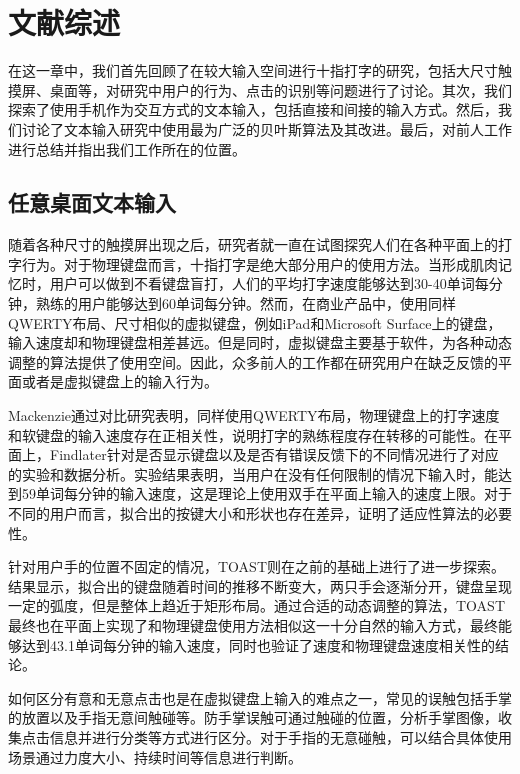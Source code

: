 \chapter{文献综述}
\label{cha:literature}
在这一章中，我们首先回顾了在较大输入空间进行十指打字的研究，包括大尺寸触摸屏、桌面等，对研究中用户的行为、点击的识别等问题进行了讨论。其次，我们探索了使用手机作为交互方式的文本输入，包括直接和间接的输入方式。然后，我们讨论了文本输入研究中使用最为广泛的贝叶斯算法及其改进。最后，对前人工作进行总结并指出我们工作所在的位置。

\section{任意桌面文本输入} %
随着各种尺寸的触摸屏出现之后，研究者就一直在试图探究人们在各种平面上的打字行为。对于物理键盘而言，十指打字是绝大部分用户的使用方法。当形成肌肉记忆时，用户可以做到不看键盘盲打，人们的平均打字速度能够达到30-40单词每分钟，熟练的用户能够达到60单词每分钟\cite{flatglass2011findlater}。然而，在商业产品中，使用同样QWERTY布局、尺寸相似的虚拟键盘，例如iPad和Microsoft Surface上的键盘，输入速度却和物理键盘相差甚远。但是同时，虚拟键盘主要基于软件，为各种动态调整的算法提供了使用空间。因此，众多前人的工作都在研究用户在缺乏反馈的平面或者是虚拟键盘上的输入行为。

Mackenzie通过对比研究表明\cite{mackenzie2001empirical}，同样使用QWERTY布局，物理键盘上的打字速度和软键盘的输入速度存在正相关性，说明打字的熟练程度存在转移的可能性。在平面上，Findlater针对是否显示键盘以及是否有错误反馈下的不同情况进行了对应的实验和数据分析\cite{flatglass2011findlater}。实验结果表明，当用户在没有任何限制的情况下输入时，能达到59单词每分钟的输入速度，这是理论上使用双手在平面上输入的速度上限。对于不同的用户而言，拟合出的按键大小和形状也存在差异，证明了适应性算法的必要性。

针对用户手的位置不固定的情况，TOAST\cite{2018shitoast}则在之前的基础上进行了进一步探索。结果显示，拟合出的键盘随着时间的推移不断变大，两只手会逐渐分开，键盘呈现一定的弧度，但是整体上趋近于矩形布局。通过合适的动态调整的算法，TOAST\cite{2018shitoast}最终也在平面上实现了和物理键盘使用方法相似这一十分自然的输入方式，最终能够达到43.1单词每分钟的输入速度，同时也验证了速度和物理键盘速度相关性的结论\cite{mackenzie2001empirical}。


如何区分有意和无意点击也是在虚拟键盘上输入的难点之一，常见的误触包括手掌的放置以及手指无意间触碰等。防手掌误触可通过触碰的位置\cite{2018shitoast}，分析手掌图像\cite{ewerling2012finger}，收集点击信息并进行分类\cite{schwarz2014probabilistic}等方式进行区分。对于手指的无意碰触，可以结合具体使用场景通过力度大小、持续时间等信息进行判断。

